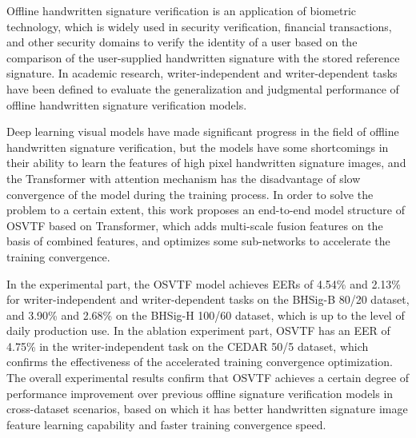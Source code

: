 Offline handwritten signature verification is an application of biometric technology, which is widely used in security verification, financial transactions, and other security domains to verify the identity of a user based on the comparison of the user-supplied handwritten signature with the stored reference signature. In academic research, writer-independent and writer-dependent tasks have been defined to evaluate the generalization and judgmental performance of offline handwritten signature verification models.

Deep learning visual models have made significant progress in the field of offline handwritten signature verification, but the models have some shortcomings in their ability to learn the features of high pixel handwritten signature images, and the Transformer with attention mechanism has the disadvantage of slow convergence of the model during the training process. In order to solve the problem to a certain extent, this work proposes an end-to-end model structure of OSVTF based on Transformer, which adds multi-scale fusion features on the basis of combined features, and optimizes some sub-networks to accelerate the training convergence. 

In the experimental part, the OSVTF model achieves EERs of 4.54\% and 2.13\% for writer-independent and writer-dependent tasks on the BHSig-B 80/20 dataset, and 3.90\% and 2.68\% on the BHSig-H 100/60 dataset, which is up to the level of daily production use. In the ablation experiment part, OSVTF has an EER of 4.75\% in the writer-independent task on the CEDAR 50/5 dataset, which confirms the effectiveness of the accelerated training convergence optimization. The overall experimental results confirm that OSVTF achieves a certain degree of performance improvement over previous offline signature verification models in cross-dataset scenarios, based on which it has better handwritten signature image feature learning capability and faster training convergence speed.






